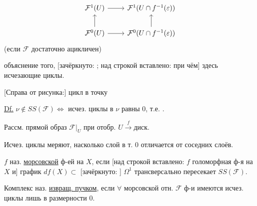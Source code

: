\begin{equation*}
\begin{tikzcd}
\mathcal{F}^1(U) \arrow[r] & \mathcal{F}^1(U\cap f^{-1}(\varepsilon)) \\
\mathcal{F}^0(U) \arrow[r] \arrow[u] & \mathcal{F}^0(U\cap f^{-1}(\varepsilon)) \arrow[u]
\end{tikzcd}
\end{equation*}
(если $\mathcal{F}$ достаточно
ацикличен)


объяснение того, [зачёркнуто: ; над строкой вставлено: при чём] здесь исчезающие циклы.




[Справа от рисунка:] цикл  в точку

\underline{Df.} $\nu\notin SS(\mathcal F)\Longleftrightarrow$ исчез. циклы в $\nu$ равны $0$, т.е. .

Рассм. прямой образ $\mathcal F|_U$ при отобр. $U\overset{f}{\longrightarrow}\text{диск}$.

Исчез. циклы меряют, насколько слой в т. $0$ отличается от соседних слоёв.

$f$ наз. \underline{морсовской} ф-ей на $X$, если [над строкой вставлено: $f$ голоморфная ф-я на $X$ и] график $df(X)\subset$ [зачёркнуто: ] $\Omega^1$ трансверсально пересекает $SS(\mathcal F)$.

Комплекс наз. \underline{извращ. пучком}, если $\forall$ морсовской отн. $\mathcal F$ ф-и имеются исчез. циклы лишь в размерности $0$.

